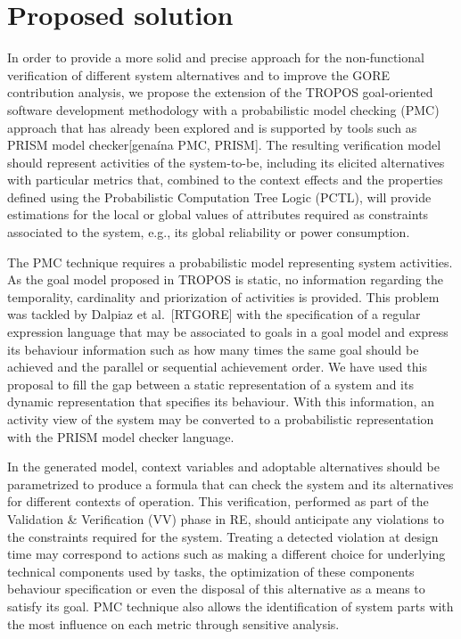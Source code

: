 \section{Proposed solution}

In order to provide a more solid and precise approach for the non-functional verification of different system alternatives and to improve the GORE contribution analysis, we propose the extension of the TROPOS goal-oriented software development methodology with a probabilistic model checking (PMC) approach that has already been explored and is supported by tools such as PRISM model checker[genaína PMC, PRISM]. The resulting verification model should represent activities of the system-to-be, including its elicited alternatives with particular metrics that, combined to the context effects and the properties defined using the Probabilistic Computation Tree Logic (PCTL), will provide estimations for the local or global values of attributes required as constraints associated to the system, e.g., its global reliability or power consumption.

The PMC technique requires a probabilistic model representing system activities. As the goal model proposed in TROPOS is static, no information regarding the temporality, cardinality and priorization of activities is provided. This problem was tackled by Dalpiaz et al.~[RTGORE] with the specification of a regular expression language that may be associated to goals in a goal model and express its behaviour information such as how many times the same goal should be achieved and the parallel or sequential achievement order. We have used this proposal to fill the gap between a static representation of a system and its dynamic representation that specifies its behaviour. With this information, an activity view of the system may be converted to a probabilistic representation with the PRISM model checker language.

In the generated model, context variables and adoptable alternatives should be parametrized to produce a formula that can check the system and its alternatives for different contexts of operation. This verification, performed as part of the Validation \& Verification (VV) phase in RE, should anticipate any violations to the constraints required for the system. Treating a detected violation at design time may correspond to actions such as making a different choice for underlying technical components used by tasks, the optimization of these components behaviour specification or even the disposal of this alternative as a means to satisfy its goal. PMC technique also allows the identification of system parts with the most influence on each metric through sensitive analysis.

